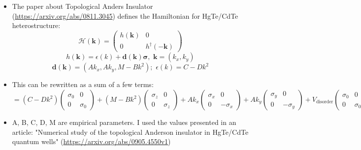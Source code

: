 \documentclass[12pt]{article}
\newcommand{\bb}[1]{\mathbf{#1}}
\numberwithin{equation}{section}
\begin{document}
\newpage
\begin{itemize}
  \item The paper about Topological Anders Insulator (\url{https://arxiv.org/abs/0811.3045}) defines the 
  Hamiltonian for HgTe/CdTe heterostructure:
  \begin{equation*}
    \mathcal H(\bb k) = \left(
      \begin{array}{cc}
        h(\bb k) & 0 \\
        0 & h^{\dagger}(-\bb k) 
      \end{array}
      \right)
  \end{equation*}
  \begin{equation*}
    h(\bb k) = \epsilon(k) + \bb d (\bb k)\bb\sigma \textrm{, } \, \bb k = (k_x, k_y) 
  \end{equation*}
  \begin{equation*}
    \bb d(\bb k ) = (Ak_x, Ak_y, M-Bk^2) \textrm{; } \, \epsilon(k) = C-Dk^2
  \end{equation*}

  \item This can be rewritten as a sum of a few terms:
  \begin{equation*}
    =(C-Dk^2)\left(
  \begin{array}{cc}
  \sigma_0 & 0 \\
  0 & \sigma_0
  \end{array}
  \right)
  + (M-Bk^2)
  \left(
  \begin{array}{cc}
  \sigma_z & 0 \\
  0 & \sigma_z
  \end{array}
  \right)
  + Ak_x 
  \left(
  \begin{array}{cc}
  \sigma_x & 0 \\
  0 & -\sigma_x
  \end{array}
  \right)
  + Ak_y
  \left(
  \begin{array}{cc}
  \sigma_y & 0 \\
  0 & -\sigma_y
  \end{array}
  \right)
  + V_{\textrm{disorder}} 
  \left(
  \begin{array}{cc}
  \sigma_0 & 0 \\
  0 & \sigma_0
  \end{array}
  \right)
  \end{equation*}

  \item A, B, C, D, M are empirical parameters. I used the values presented in an article:
  "Numerical study of the topological Anderson insulator in HgTe/CdTe quantum wells"
  (\url{https://arxiv.org/abs/0905.4550v1})
\end{itemize}
\end{document}
